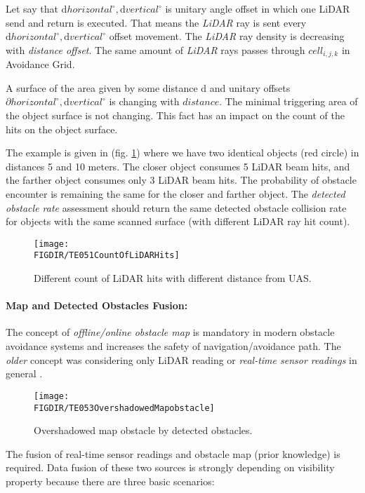 Let say that $\text{d} horizontal^\circ, \text{d} vertical^\circ$ is unitary angle offset in which one LiDAR send and return is executed. That means the \emph{LiDAR} ray is sent every $\text{d} horizontal^\circ, \text{d} vertical^\circ$ offset movement. The \emph{LiDAR} ray density is decreasing with \emph{distance offset}. The same amount of \emph{LiDAR} rays passes through $cell_{i,j,k}$ in Avoidance Grid.

A surface of the area given by some distance d and unitary offsets$\partial horizontal^\circ, \text{d} vertical^\circ$  is changing with $distance$. The minimal triggering area of the object surface is not changing. This fact has an impact on the count of the hits on the object surface. 

The example is given in (fig. \ref{fig:P01CountOfLiDARHits}) where we have two identical objects (red circle) in distances 5 and 10 meters. The closer object consumes 5 LiDAR beam hits, and the farther object consumes only 3 LiDAR beam hits. The probability of obstacle encounter is remaining the same for the closer and farther object. The \emph{detected obstacle rate} assessment should return the same  detected obstacle collision rate for objects with the same scanned surface (with different LiDAR ray hit count).

\begin{figure}[H]
    \centering
    \texttt{[image: \\FIGDIR/TE051CountOfLiDARHits]}
    \caption{Different count of LiDAR hits with different distance from UAS.}
    \label{fig:P01CountOfLiDARHits}
\end{figure}


\paragraph{Map and Detected Obstacles Fusion:} The concept of \emph{offline/online obstacle map} is mandatory in modern obstacle avoidance systems and increases the safety of navigation/avoidance path. The \emph{older} concept was considering only LiDAR reading or \emph{real-time sensor readings} in general \cite{gomola2017probabilistic}. 

\begin{figure}[htbp]
    \centering
    \texttt{[image: \\FIGDIR/TE053OvershadowedMapobstacle]}
    \caption{Overshadowed map obstacle by detected obstacles.}
    \label{fig:P02OvershadowedMapobstacle}
\end{figure}

\newpage\noindent The fusion of real-time sensor readings and obstacle map (prior knowledge) is required. Data fusion of these two sources is strongly depending on visibility property because there are three basic scenarios:

